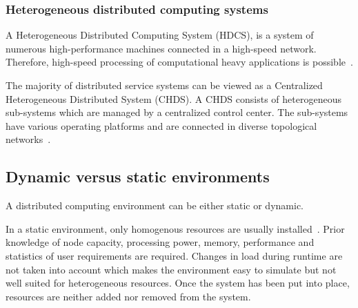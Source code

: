 \documentclass{cslthse-msc}
\begin{document}


\subsubsection{Heterogeneous distributed computing systems}
A Heterogeneous Distributed Computing System (HDCS), is a system of numerous high-performance machines connected in a high-speed network. Therefore, high-speed processing of computational heavy applications is possible~\cite{algoMinExTime}. %

The majority of distributed service systems can be viewed as a Centralized Heterogeneous Distributed System (CHDS). A CHDS consists of heterogeneous sub-systems which are managed by a centralized control center. The sub-systems have various operating platforms and are connected in diverse topological networks~\cite{studyServiceRel}.


\subsection{Dynamic versus static environments} \label{subsec:background_dyn_stat_env}
A distributed computing environment can be either static or dynamic.

In a static environment, only homogenous resources are usually installed~\cite{compStudyLoadAndCloud}. Prior knowledge of node capacity, processing power, memory, performance and statistics of user requirements are required. Changes in load during runtime are not taken into account which makes the environment easy to simulate but not well suited for heterogeneous resources. Once the system has been put into place, resources are neither added nor removed from the system.
\end{document}
